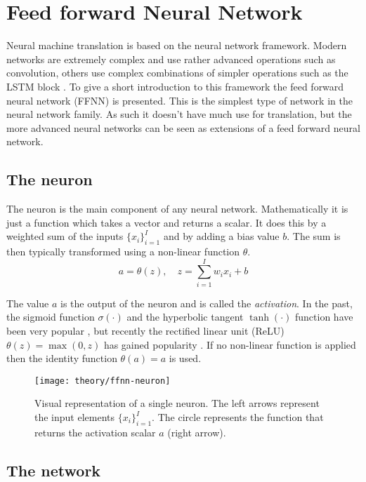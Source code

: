 \section{Feed forward Neural Network}
\label{sec:theory:ffnn}

Neural machine translation is based on the neural network framework. Modern networks are extremely complex and use rather advanced operations such as convolution, others use complex combinations of simpler operations such as the LSTM block \cite{deep-learning}. To give a short introduction to this framework the feed forward neural network (FFNN) is presented. This is the simplest type of network in the neural network family. As such it doesn't have much use for translation, but the more advanced neural networks can be seen as extensions of a feed forward neural network.

\subsection{The neuron}

The neuron is the main component of any neural network. Mathematically it is just a function which takes a vector and returns a scalar. It does this by a weighted sum of the inputs $\{ x_i \}_{i=1}^I$ and by adding a bias value $b$. The sum is then typically transformed using a non-linear function $\theta$.
\begin{equation}
a = \theta(z),\quad z = \sum_{i=1}^I w_{i} x_i + b
\end{equation}

The value $a$ is the output of the neuron and is called the \textit{activation}. In the past, the sigmoid function $\sigma(\cdot)$ and the hyperbolic tangent $\tanh(\cdot)$ function have been very popular \cite{bishop}, but recently the rectified linear unit (ReLU) $\theta(z) = \max(0, z)$ has gained popularity \cite{deep-learning}. If no non-linear function is applied then the identity function $\theta(a) = a$ is used.

\begin{figure}[H]
	\centering
	\texttt{[image: theory/ffnn-neuron]}
	\caption{Visual representation of a single neuron. The left arrows represent the input elements $\{ x_i \}_{i=1}^I$. The circle represents the function that returns the activation scalar $a$ (right arrow).}
\end{figure}

\subsection{The network}


